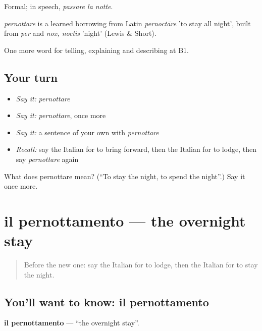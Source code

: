 Formal; in speech, \emph{passare la notte}.

\begin{cousinweb}
\emph{pernottare} is a learned borrowing from Latin \emph{pernoctāre} 'to stay all night', built from \emph{per} and \emph{nox, noctis} 'night' (Lewis \& Short).
\end{cousinweb}

\begin{grammarlens}[title={What you've built}]
One more word for telling, explaining and describing at B1.
\end{grammarlens}

\subsection*{Your turn}
\begin{itemize}
\raggedright
  \item \emph{Say it:} \emph{pernottare}
  \item \emph{Say it:} \emph{pernottare}, once more
  \item \emph{Say it:} a sentence of your own with \emph{pernottare}
  \item \emph{Recall:} say the Italian for to bring forward, then the Italian for to lodge, then say \emph{pernottare} again
\end{itemize}

\begin{tcolorbox}[breakable,colback=teal!4,colframe=teal!35!black,title={Before you move on}]
What does pernottare mean? (\textquotedblleft{}To stay the night, to spend the night\textquotedblright{}.) Say it once more.
\end{tcolorbox}
\section[il pernottamento]{il pernottamento — the overnight stay}

\label{lesson:IT-C432-pernottamento}



\begin{quote}
Before the new one: say the Italian for to lodge, then the Italian for to stay the night.
\end{quote}

\subsection*{You'll want to know: il pernottamento}
\textbf{il pernottamento} — \textquotedblleft{}the overnight stay\textquotedblright{}.


